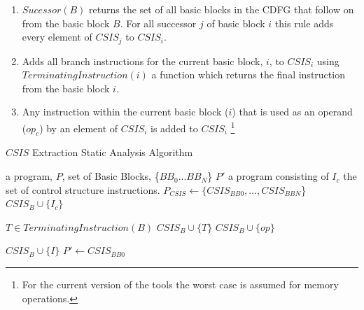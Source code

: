 \begin{enumerate}[label=Rule \arabic*]
    \setlength{\itemsep}{3pt}
    \setlength{\parskip}{0pt}
    \setlength{\parsep}{0pt}
    \item $\mathit{Sucessor(B)}$ returns the set of all basic blocks in the CDFG that follow on from the basic block $B$.
	  For all successor  $j$ of basic block $i$ this rule adds every element of $\mathit{CSIS}_j$ to $\mathit{CSIS}_i$.
    \item Adds all branch instructions for the current basic block, $i$, to $\mathit{CSIS}_i$ using
	  $\mathit{TerminatingInstruction(i)}$ a function which returns the final instruction from the basic block $i$.
    \item Any instruction within the current basic block ($i$) that is used as an operand ($\mathit{op_{c}}$) by an element of $\mathit{CSIS}_i$ is added to $\mathit{CSIS}_i$ \footnote{For the current version of the tools the worst case is assumed for memory operations.}
\end{enumerate}
\vspace{-4pt}

\begin{algorithm}[h]
\caption{$\mathit{CSIS}$ Extraction Static Analysis Algorithm
\label{alg:CSIS-extraction}}
    \begin{algorithmic}[1]
        \INPUT a program, $P$, set of Basic Blocks, \{$\mathit{BB}_0$...$\mathit{BB}_N$\}
        \OUTPUT $P'$ a program consisting of $I_c$ the set of control structure instructions.
        \Statex
            \State $P_{\mathit{CSIS}} \gets \{\mathit{CSIS}_{\mathit{BB0}}, \dots,  \mathit{CSIS}_{BBN}$\}
                \\\hrulefill
                        \State $\mathit{CSIS}_B \cup \{I_{c}\}$
                    \EndFor
                \EndFor
                \\\hrulefill

                \State $T \in TerminatingInstruction(B)$
                \State $\mathit{CSIS}_{B} \cup \{T\}$
                    \State $\mathit{CSIS}_{B} \cup \{op\}$
                \EndFor
                \\\hrulefill

                                \State $\mathit{CSIS}_{B} \cup \{I\}$
                            \EndIf
                        \EndFor
                    \EndFor
                \EndFor
            \EndFor
	\State $P' \gets \mathit{CSIS}_{\mathit{BB0}}$
        \EndWhile
    \end{algorithmic}
\end{algorithm}

